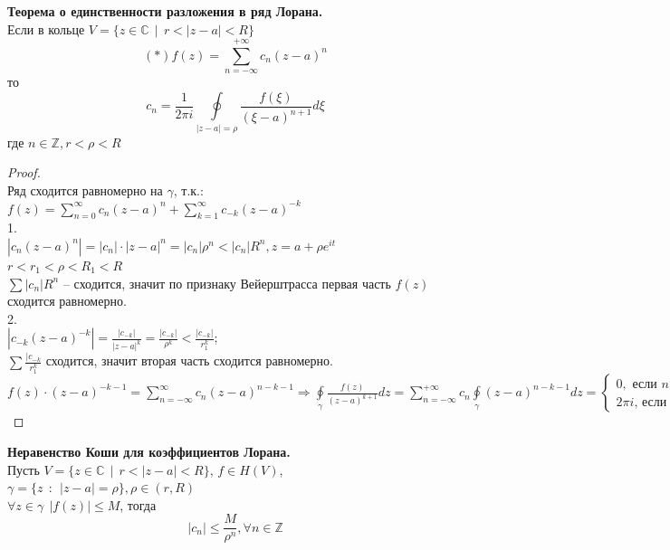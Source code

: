 \textbf{Теорема о единственности разложения в ряд Лорана.}\\[2mm]
Если в кольце $V = \{z\in\mathbb{C} ~~|~~ r < |z - a| < R\}$
$$
(*) f(z) = \sum\limits_{n=-\infty}^{+\infty}c_n(z - a)^n
$$
то
$$
c_n = \frac{1}{2\pi i}\oint\limits_{|z - a| = \rho} \frac{f(\xi)}{(\xi - a)^{n + 1}} d\xi
$$
где $n\in\mathbb{Z}, r < \rho < R$

\begin{proof}
    \ \\
    Ряд сходится равномерно на $\gamma$, т.к.:\\
    $f(z)=\sum_{n=0}^\infty c_n(z-a)^n + \sum_{k=1}^\infty c_{-k}(z-a)^{-k}$\\
    1.\\
    $|c_n(z-a)^n|=|c_n|\cdot|z-a|^n=|c_n|\rho^n < |c_n|R^n, z=a+\rho e^{it}$\\
    $r<r_1<\rho<R_1<R$\\
    $\sum|c_n|R^n$ -- сходится, значит по признаку Вейерштрасса первая часть  $f(z)$ сходится равномерно.\\
    2.\\
    $|c_{-k}(z-a)^{-k}|=\frac{|c_{-k}|}{|z-a|^k}=\frac{|c_{-k}|}{\rho^k}<\frac{|c_{-k}|}{r_1^k}$;\\
    $\sum \frac{|c_{-k}}{r_1^k}$ сходится, значит вторая часть сходится равномерно.\\[2mm]
    $f(z)\cdot (z-a)^{-k-1}=\sum_{n=-\infty}^\infty c_n(z-a)^{n-k-1}\Rightarrow \oint\limits_{\gamma}\frac{f(z)}{(z-a)^{k+1}}dz=\sum_{n=-\infty}^{+\infty}c_n\oint\limits_{\gamma}(z-a)^{n-k-1}dz = 
    \begin{cases}
        0,\text{ если }n-k\neq 0\\
        2\pi i\text{, если }n-k=0
    \end{cases}
    =c_k \cdot 2\pi i$

\end{proof}

\textbf{Неравенство Коши для коэффициентов Лорана.}\\[2mm]
Пусть $V = \{z\in\mathbb{C} ~~|~~ r < |z - a| < R\}$, $f\in H(V)$, \\$\gamma = \{z ~~ : ~~ |z - a| = \rho\}, \rho\in(r,R)$\\
$\forall z\in\gamma~~ |f(z)|\le M$, тогда
$$
|c_n| \le \frac{M}{\rho^n}, \forall n\in\mathbb{Z}
$$
